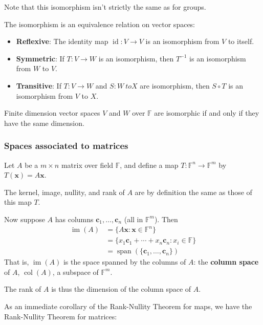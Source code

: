 Note that this isomorphism isn't strictly the same as for groups.

The isomorphism is an equivalence relation on vector spaces:
\begin{itemize}
	\item \textbf{Reflexive}: The identity map $\operatorname{id} : V \to V$ is an isomorphism from $V$ to itself.
	\item \textbf{Symmetric}: If $T : V \to W$ is an isomorphism, then $T^{-1}$ is an isomorphism from $W$ to $V$.
	\item \textbf{Transitive}: If $T : V \to W$ and $S : W \ to X$ are isomorphism, then $S \circ T$ is an isomorphism from $V$ to $X$.
\end{itemize}

\begin{theorem}{\cite{math2601_notes}}{}
	Finite dimension vector spaces $V$ and $W$ over $\mathbb{F}$ are isomorphic if and only if they have the same dimension.
\end{theorem}

\subsubsection{Spaces associated to matrices}

Let $A$ be a $m \times n$ matrix over field $\mathbb{F}$, and define a map $T : \mathbb{F}^n \to \mathbb{F}^m$ by $T(\mathbf{x}) = A \mathbf{x}$.

The kernel, image, nullity, and rank of $A$ are by definition the same as those of this map $T$.

Now suppose $A$ has columns $\mathbf{c}_1, \ldots, \mathbf{c}_n$ (all in $\mathbb{F}^m$). Then
\begin{align*}
	\operatorname{im}(A) &= \{ A \mathbf{x} : \mathbf{x} \in \mathbb{F}^n \} \\
	&= \{ x_1 \mathbf{c}_1 + \cdots + x_n \mathbf{c}_n : x_i \in \mathbb{F} \} \\
	&= \operatorname{span}(\{ \mathbf{c}_1, \ldots, \mathbf{c}_n \})
\end{align*}
That is, $\operatorname{im}(A)$ is the space spanned by the columns of $A$: the \textbf{column space} of $A$, $\operatorname{col}(A)$, a subspace of $\mathbb{F}^m$.

The rank of $A$ is thus the dimension of the column space of $A$.

As an immediate corollary of the Rank-Nullity Theorem \cite{th:rank_nullity} for maps, we have the Rank-Nullity Theorem for matrices:

